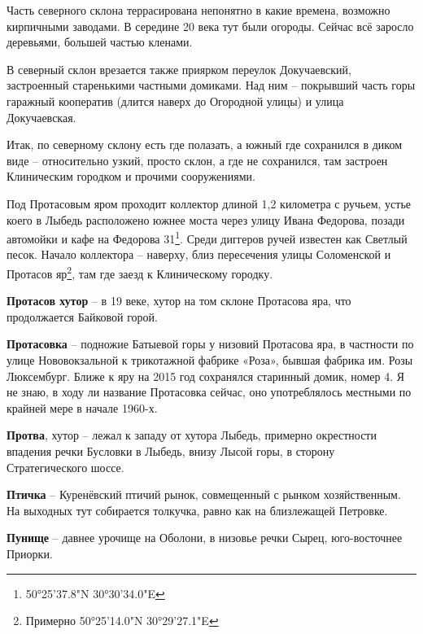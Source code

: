 Часть северного склона террасирована непонятно в какие времена, возможно кирпичными заводами. В середине 20 века тут были огороды. Сейчас всё заросло деревьями, большей частью кленами.

В северный склон врезается также приярком переулок Докучаевский, застроенный старенькими частными домиками. Над ним – покрывший часть горы гаражный кооператив (дли\-тся наверх до Огородной улицы) и улица Докучаевская.

Итак, по северному склону есть где полазать, а южный где сохранился в диком виде – относительно узкий, просто склон, а где не сохранился, там застроен Клиническим городком и прочими сооружениями.

Под Протасовым яром проходит коллектор длиной 1,2 километра с ручьем, устье коего в Лыбедь расположено южнее моста через улицу Ивана Федорова, позади автомойки и кафе на Федорова 31\footnote{50°25'37.8"N 30°30'34.0"E}. Среди диггеров ручей известен как Светлый песок. Начало коллектора – наверху, близ пересечения улицы Соломенской и Протасов яр\footnote{Примерно 50°25'14.0"N 30°29'27.1"E}, там где заезд к Клиническому городку.\\

\medskip

\textbf{Протасов хутор} – в 19 веке, хутор на том склоне Протасова яра, что продолжается Байковой горой.\\

\medskip

\textbf{Протасовка} – подножие Батыевой горы у низовий Протасова яра, в частности по улице Нововокзальной к трикотажной фабрике «Роза», бывшая фабрика им. Розы Люксембург. Ближе к яру на 2015 год сохранялся старинный домик, номер 4. Я не знаю, в ходу ли название Протасовка сейчас, оно употреблялось местными по крайней мере в начале 1960-х.\\

\medskip

\textbf{Протва}, хутор – лежал к западу от хутора Лыбедь, примерно окрестности впадения речки Бусловки в Лыбедь, внизу Лысой горы, в сторону Стратегического шоссе.\\ 

\medskip

\textbf{Птичка} – Куренёвский птичий рынок, совмещенный с рынком хозяйственным. На выходных тут собирается толкучка, равно как на близлежащей Петровке.\\

\medskip

\textbf{Пунище} – давнее урочище на Оболони, в низовье речки Сырец, юго-восточнее Приорки.

